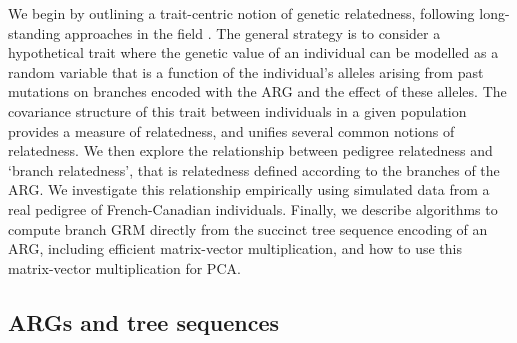 


We begin by outlining a trait-centric notion of genetic relatedness, following long-standing approaches in the field
\citep{fisher1919correlation, wright1922coefficients}.
%
The general strategy is to consider a hypothetical trait where the genetic value of an individual can be modelled as a random variable that is a function of the individual's alleles arising from past mutations on branches encoded with the ARG and the effect of these alleles.
%
The covariance structure of this trait between individuals in a given population provides a measure of relatedness, and unifies several common notions of relatedness.
%
We then explore the relationship between pedigree relatedness and `branch relatedness', that is relatedness defined according to the branches of the ARG. We investigate this relationship empirically using simulated data from a real pedigree of French-Canadian individuals.
%
Finally, we describe algorithms to compute branch GRM directly from the succinct tree sequence encoding of an ARG, including efficient matrix-vector multiplication, and how to use this matrix-vector multiplication for PCA.

\subsection{ARGs and tree sequences}

